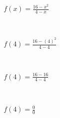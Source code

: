 \begin{align}
f(x)=\frac{16-x^2}{4-x}\\\\\\\\\\\\\\\\
f(4)=\frac{16-(4)^2}{4-4}\\\\\\\\\\\\\\\\
f(4)=\frac{16-16}{4-4}\\\\\\\\\\\\\\\\
f(4)=\frac{0}{0}\end{align}